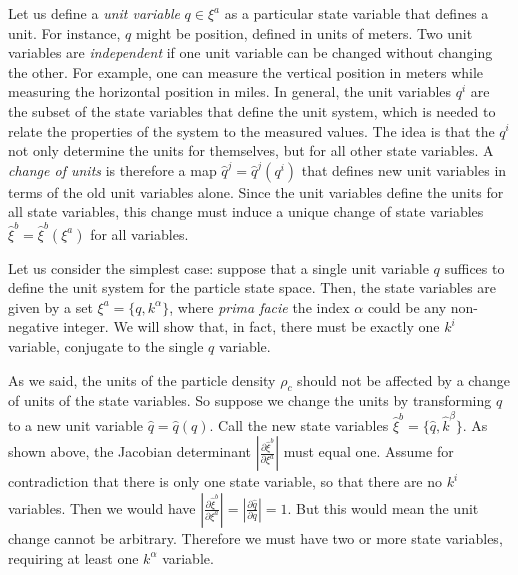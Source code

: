 \documentclass[letterpaper]{article}
\begin{document}
Let us define a \textit{unit variable} $q \in \xi^a$ as a particular state variable that defines a unit. For instance, $q$ might be position, defined in units of meters. Two unit variables are \textit{independent} if one unit variable can be changed without changing the other. For example, one can measure the vertical position in meters while measuring the horizontal position in miles.  In general, the unit variables $q^i$ are the subset of the state variables that define the unit system, which is needed to relate the properties of the system to the measured values. The idea is that the $q^i$ not only determine the units for themselves, but for all other state variables. A \textit{change of units} is therefore a map $\hat{q}^j = \hat{q}^j(q^i)$ that defines new unit variables in terms of the old unit variables alone. Since the unit variables define the units for all state variables, this change must induce a unique change of state variables $\hat{\xi}^b = \hat{\xi}^b(\xi^a)$ for all variables.



Let us consider the simplest case: suppose that a single unit variable $q $ suffices to define the unit system for the particle state space. Then, the state variables are given by a set $\xi^a = \{ q, k^\alpha \}$, where \textit{prima facie} the index $\alpha$ could be any non-negative integer. We will show that, in fact, there must be exactly one $k^i$ variable, conjugate to the single $q$ variable. 

As we said, the units of the particle density $\rho_c$ should not be affected by a change of units of the state variables. So suppose we change the units by transforming $q$ to a new unit variable $\hat{q}=\hat{q}(q)$. Call the new state variables $\hat{\xi}^b = \{ \hat{q}, \hat{k}^\beta\}$. As shown above, the Jacobian determinant $\left|\frac{\partial \hat{\xi}^b}{\partial \xi^a} \right|$ must equal one. Assume for contradiction that there is only one state variable, so that there are no $k^i$ variables. Then we would have $\left|\frac{\partial \hat{\xi}^b}{\partial \xi^a} \right| = \left|\frac{\partial \hat q}{\partial q} \right| = 1$. But this would mean the unit change cannot be arbitrary. Therefore we must have two or more state variables, requiring at least one $k^\alpha$ variable. 
\end{document}
